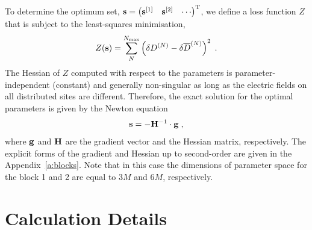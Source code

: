 \documentclass[aip,amsmath,amssymb,reprint,floatfix]{revtex4-1}
\begin{document}
To determine the optimum set,
$
 {\bf s} = 
\begin{pmatrix}
{\bf s}^{[1]} &
{\bf s}^{[2]} & \cdots
\end{pmatrix}^{\rm T}
$, we define a loss function $Z$ 
that is subject to the least\hyp{}squares minimisation,
%
\begin{equation}\label{e:Z}
 Z({\bf s}) = \sum_N^{N_{\rm max}} \left( \delta D^{(N)} - \delta \overline{D}^{(N)} \right)^2 \;.
\end{equation}
%
The Hessian of $Z$ computed with respect to the parameters 
is parameter\hyp{}independent (constant) and generally non\hyp{}singular
as long as the electric fields on all distributed sites are different.
Therefore, the exact solution for the optimal parameters is given by the Newton equation
%
\begin{equation}\label{e:Newton}
 {\bf s} = -{\bf H}^{-1} \cdot {\bf g} \;,
\end{equation}
%
where ${\bf g}$ and ${\bf H}$ are the gradient vector and the Hessian matrix, respectively.
The explicit forms of the gradient and Hessian up to second\hyp{}order 
are given in the Appendix~\ref{a:blocks}.
Note that in this case the dimensions of parameter space for the block 1 and 2 are
equal to $3M$ and $6M$, respectively.

\section{\label{s:3}Calculation Details}
\end{document}
